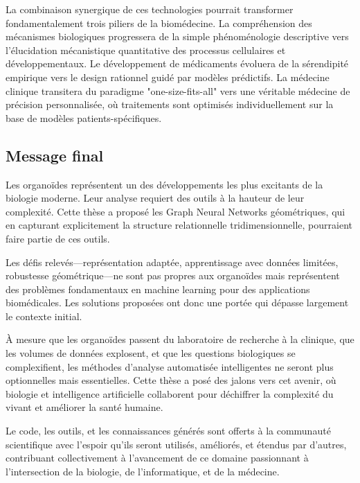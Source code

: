 La combinaison synergique de ces technologies pourrait transformer fondamentalement trois piliers de la biomédecine. La compréhension des mécanismes biologiques progressera de la simple phénoménologie descriptive vers l'élucidation mécanistique quantitative des processus cellulaires et développementaux. Le développement de médicaments évoluera de la sérendipité empirique vers le design rationnel guidé par modèles prédictifs. La médecine clinique transitera du paradigme "one-size-fits-all" vers une véritable médecine de précision personnalisée, où traitements sont optimisés individuellement sur la base de modèles patients-spécifiques.

\subsection{Message final}

Les organoïdes représentent un des développements les plus excitants de la biologie moderne. Leur analyse requiert des outils à la hauteur de leur complexité. Cette thèse a proposé les Graph Neural Networks géométriques, qui en capturant explicitement la structure relationnelle tridimensionnelle, pourraient faire partie de ces outils.

Les défis relevés—représentation adaptée, apprentissage avec données limitées, robustesse géométrique—ne sont pas propres aux organoïdes mais représentent des problèmes fondamentaux en machine learning pour des applications biomédicales. Les solutions proposées ont donc une portée qui dépasse largement le contexte initial.

À mesure que les organoïdes passent du laboratoire de recherche à la clinique, que les volumes de données explosent, et que les questions biologiques se complexifient, les méthodes d'analyse automatisée intelligentes ne seront plus optionnelles mais essentielles. Cette thèse a posé des jalons vers cet avenir, où biologie et intelligence artificielle collaborent pour déchiffrer la complexité du vivant et améliorer la santé humaine.

Le code, les outils, et les connaissances générés sont offerts à la communauté scientifique avec l'espoir qu'ils seront utilisés, améliorés, et étendus par d'autres, contribuant collectivement à l'avancement de ce domaine passionnant à l'intersection de la biologie, de l'informatique, et de la médecine.
